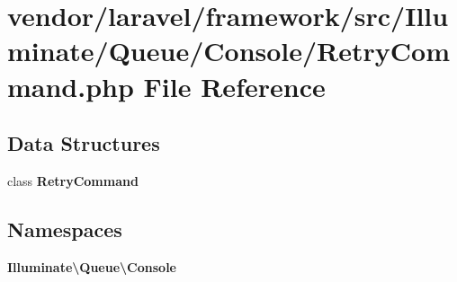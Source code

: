 \section{vendor/laravel/framework/src/\+Illuminate/\+Queue/\+Console/\+Retry\+Command.php File Reference}
\label{_retry_command_8php}
\subsection*{Data Structures}
\begin{DoxyCompactItemize}
\item 
class {\bf Retry\+Command}
\end{DoxyCompactItemize}
\subsection*{Namespaces}
\begin{DoxyCompactItemize}
\item 
 {\bf Illuminate\textbackslash{}\+Queue\textbackslash{}\+Console}
\end{DoxyCompactItemize}
